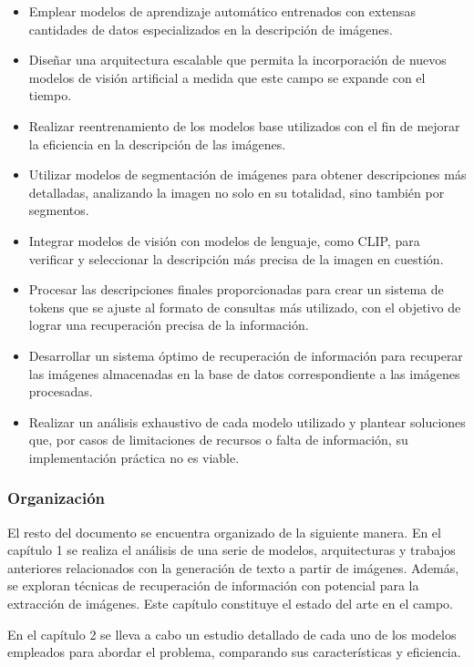 \begin{itemize}
\item Emplear modelos de aprendizaje autom\'atico entrenados con extensas cantidades de datos especializados en la descripci\'on de im\'agenes.
\item Diseñar una arquitectura escalable que permita la incorporaci\'on de nuevos modelos de visi\'on artificial a medida que este campo se expande con el tiempo.
\item Realizar reentrenamiento de los modelos base utilizados con el fin de mejorar la eficiencia en la descripci\'on de las im\'agenes.
\item Utilizar modelos de segmentaci\'on de im\'agenes para obtener descripciones m\'as detalladas, analizando la imagen no solo en su totalidad, sino tambi\'en por segmentos.
\item Integrar modelos de visi\'on con modelos de lenguaje, como CLIP, para verificar y seleccionar la descripci\'on m\'as precisa de la imagen en cuesti\'on.
\item Procesar las descripciones finales proporcionadas para crear un sistema de tokens que se ajuste al formato de consultas m\'as utilizado, con el objetivo de lograr una recuperaci\'on precisa de la informaci\'on.
\item Desarrollar un sistema \'optimo de recuperaci\'on de informaci\'on para recuperar las im\'agenes almacenadas en la base de datos correspondiente a las im\'agenes procesadas.
\item Realizar un an\'alisis exhaustivo de cada modelo utilizado y plantear soluciones que, por casos de limitaciones de recursos o falta de informaci\'on, su implementaci\'on pr\'actica no es viable.
\end{itemize}


\subsubsection*{Organizaci\'on}
El resto del documento se encuentra organizado de la siguiente manera. En el cap\'itulo 1 se realiza el an\'alisis de una serie de modelos, arquitecturas y trabajos anteriores relacionados con la generaci\'on de texto a partir de im\'agenes. Adem\'as, se exploran t\'ecnicas de recuperaci\'on de informaci\'on con potencial para la extracci\'on de im\'agenes. Este cap\'itulo constituye el estado del arte en el campo.

En el cap\'itulo 2 se lleva a cabo un estudio detallado de cada uno de los modelos empleados para abordar el problema, comparando sus caracter\'isticas y eficiencia.

